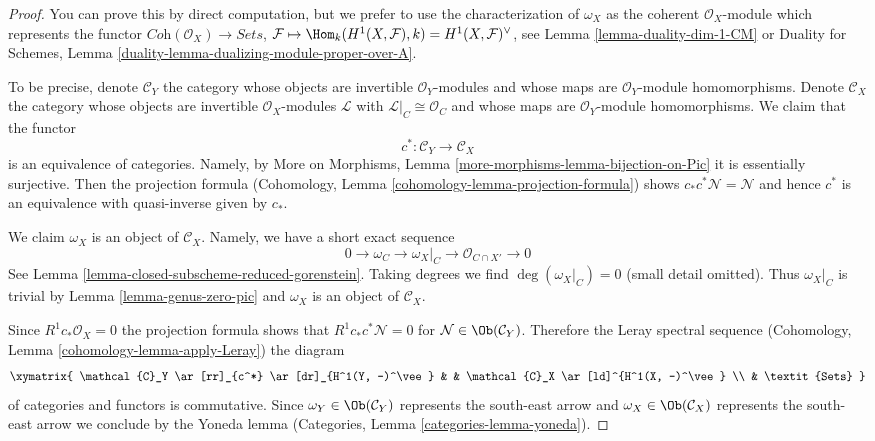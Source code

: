 \begin{proof}
You can prove this by direct computation, but we prefer to use the
characterization of $\omega_X$ as the coherent $\mathcal{O}_X$-module
which represents the functor
$\textit{Coh}(\mathcal{O}_X) \to \textit{Sets}$,
$\mathcal{F} \mapsto \Hom_k(H^1(X, \mathcal{F}), k) =
H^1(X, \mathcal{F})^\vee$, see
Lemma \ref{lemma-duality-dim-1-CM} or Duality for Schemes, Lemma
\ref{duality-lemma-dualizing-module-proper-over-A}.

\medskip\noindent
To be precise, denote $\mathcal{C}_Y$ the category whose objects are
invertible $\mathcal{O}_Y$-modules and whose maps are
$\mathcal{O}_Y$-module homomorphisms. Denote $\mathcal{C}_X$ the category
whose objects are invertible $\mathcal{O}_X$-modules $\mathcal{L}$ with
$\mathcal{L}|_C \cong \mathcal{O}_C$ and whose maps are
$\mathcal{O}_Y$-module homomorphisms. We claim that the functor
$$
c^* : \mathcal{C}_Y \to \mathcal{C}_X
$$
is an equivalence of categories. Namely, by
More on Morphisms, Lemma \ref{more-morphisms-lemma-bijection-on-Pic}
it is essentially surjective. Then the projection formula
(Cohomology, Lemma \ref{cohomology-lemma-projection-formula})
shows $c_*c^*\mathcal{N} = \mathcal{N}$ and hence $c^*$
is an equivalence with quasi-inverse given by $c_*$.

\medskip\noindent
We claim $\omega_X$ is an object of $\mathcal{C}_X$. Namely, we have a
short exact sequence
$$
0 \to \omega_C \to \omega_X|_C \to \mathcal{O}_{C \cap X'} \to 0
$$
See Lemma \ref{lemma-closed-subscheme-reduced-gorenstein}.
Taking degrees we find $\deg(\omega_X|_C) = 0$ (small detail omitted).
Thus $\omega_X|_C$ is trivial by Lemma \ref{lemma-genus-zero-pic}
and $\omega_X$ is an object of $\mathcal{C}_X$.

\medskip\noindent
Since $R^1c_*\mathcal{O}_X = 0$ the projection formula shows that
$R^1c_*c^*\mathcal{N} = 0$ for $\mathcal{N} \in \Ob(\mathcal{C}_Y)$.
Therefore the Leray spectral sequence
(Cohomology, Lemma \ref{cohomology-lemma-apply-Leray})
the diagram
$$
\xymatrix{
\mathcal{C}_Y \ar[rr]_{c^*} \ar[dr]_{H^1(Y, -)^\vee} & &
\mathcal{C}_X \ar[ld]^{H^1(X, -)^\vee} \\
& \textit{Sets}
}
$$
of categories and functors is commutative. Since
$\omega_Y \in \Ob(\mathcal{C}_Y)$ represents the south-east arrow and
$\omega_X \in \Ob(\mathcal{C}_X)$ represents the south-east arrow
we conclude by the Yoneda lemma
(Categories, Lemma \ref{categories-lemma-yoneda}).
\end{proof}













